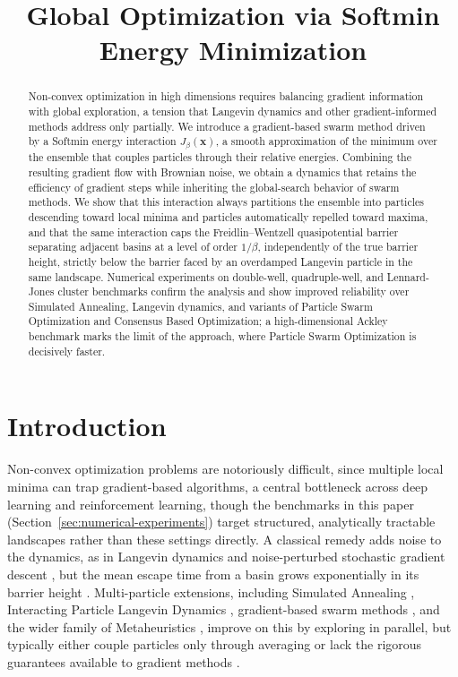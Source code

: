 \documentclass{opt2026} %
\title[Global Optimization via Softmin Energy Minimization]{Global Optimization via Softmin Energy Minimization}
\newcommand{\xx}{\mathbf{x}}
\begin{document}
\maketitle

\begin{abstract}
    Non-convex optimization in high dimensions requires balancing gradient information with global exploration, a tension that Langevin dynamics and other gradient-informed methods address only partially. We introduce a gradient-based swarm method driven by a Softmin energy interaction $J_\beta(\xx)$, a smooth approximation of the minimum over the ensemble that couples particles through their relative energies. Combining the resulting gradient flow with Brownian noise, we obtain a dynamics that retains the efficiency of gradient steps while inheriting the global-search behavior of swarm methods. We show that this interaction always partitions the ensemble into particles descending toward local minima and particles automatically repelled toward maxima, and that the same interaction caps the Freidlin--Wentzell quasipotential barrier separating adjacent basins at a level of order $1/\beta$, independently of the true barrier height, strictly below the barrier faced by an overdamped Langevin particle in the same landscape. Numerical experiments on double-well, quadruple-well, and Lennard-Jones cluster benchmarks confirm the analysis and show improved reliability over Simulated Annealing, Langevin dynamics, and variants of Particle Swarm Optimization and Consensus Based Optimization; a high-dimensional Ackley benchmark marks the limit of the approach, where Particle Swarm Optimization is decisively faster.
\end{abstract}

\section{Introduction}
\label{sec:intro}

Non-convex optimization problems are notoriously difficult, since multiple local minima can trap gradient-based algorithms, a central bottleneck across deep learning and reinforcement learning, though the benchmarks in this paper (Section~\ref{sec:numerical-experiments}) target structured, analytically tractable landscapes rather than these settings directly. A classical remedy adds noise to the dynamics, as in Langevin dynamics \citep{CoffeyKalmykovWaldron2004} and noise-perturbed stochastic gradient descent \citep{fehrman2020convergence}, but the mean escape time from a basin grows exponentially in its barrier height \citep{berglund2011kramers}. Multi-particle extensions, including Simulated Annealing \citep{kirkpatrick1983optimization,gelfand1990sampling,tang2024discrete}, Interacting Particle Langevin Dynamics \citep{akyildiz2025interacting,encinar2025proximal}, gradient-based swarm methods \citep{riedl2023gradient,bolte2024swarm,carrillo2021consensus,noel2012new}, and the wider family of Metaheuristics \citep{bandaru2016metaheuristic,yang2020nature}, improve on this by exploring in parallel, but typically either couple particles only through averaging or lack the rigorous guarantees available to gradient methods \citep{hussain2019metaheuristic,rajwar2023exhaustive}.
\end{document}
